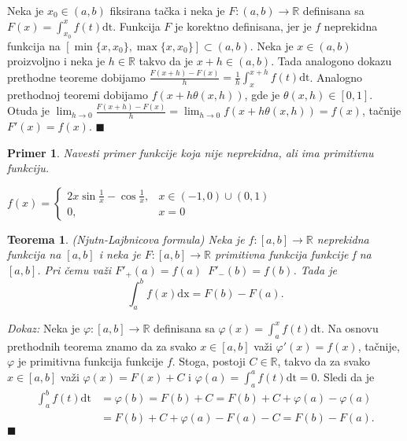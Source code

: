\documentclass{article}
\newtheorem{teorema}{Teorema}[section]
\newtheorem{prim}{Primer}[section]
\begin{document}
Neka je $x_0\in(a, b)$ fiksirana tačka i neka je $F:(a, b) \longrightarrow \mathbb{R}$ definisana sa $F(x) = \displaystyle\int^x_{x_0} f(t)\text{dt}$.
Funkcija $F$ je korektno definisana, jer je $f$ neprekidna funkcija na $[\min\{x, x_0\}, \max\{x, x_0\}]\subset(a, b)$. Neka
je $x\in(a, b)$ proizvoljno i neka je $h\in\mathbb{R}$ takvo da je $x+h\in(a, b)$. Tada analogono dokazu prethodne teoreme dobijamo
$\displaystyle\frac{F(x+h)-F(x)}{h} = \frac{1}{h}\int^{x+h}_x f(t)\text{dt}$.
Analogno prethodnoj teoremi dobijamo $f(x+h\theta(x, h))$, gde je $\theta(x, h)\in[0,1]$.
Otuda je $\displaystyle \lim_{h\longrightarrow 0}\frac{F(x+h)-F(x)}{h} = \lim_{h\longrightarrow 0} f(x+h\theta(x, h)) = f(x)$, tačnije
$F'(x) = f(x)$.
\null\hfill $\blacksquare$\par
\begin{primbox}
    \begin{prim}
        Navesti primer funkcije koja nije neprekidna, ali ima primitivnu funkciju.
    \end{prim}

    $f(x) = \begin{cases}
            2x\sin\frac{1}{x} - \cos\frac{1}{x}, & x\in(-1,0)\cup(0,1) \\
            0,                                   & x = 0
        \end{cases}$
\end{primbox}
\begin{teoremabox}
    \begin{teorema}
        (Njutn-Lajbnicova formula) Neka je $f:[a, b]\longrightarrow \mathbb{R}$ neprekidna funkcija na $[a,b]$ i neka je $F:[a, b]\longrightarrow\mathbb{R}$ primitivna funkcija funkcije f na $[a,b]$. Pri čemu važi $F'_+ (a) = f(a)\,\,\,F'_-(b) = f(b)$. Tada je
        $$ \int^b_a f(x)\text{dx} = F(b) - F(a).$$
    \end{teorema}
\end{teoremabox}
\textit{Dokaz:} Neka je $\varphi: [a, b] \longrightarrow \mathbb{R}$ definisana sa
$\varphi(x) = \displaystyle\int^x_a f(t)\text{dt}$. Na osnovu prethodnih teorema znamo da za svako $x\in [a, b]$ važi $\varphi'(x) = f(x)$,
tačnije, $\varphi$ je primitivna funkcija funkcije $f$. Stoga, postoji
$C \in \mathbb{R}$, takvo da za svako $x \in [a, b]$ važi
$\varphi(x) = F(x) + C$ i $\displaystyle\varphi(a)=\int_{a}^{a} f(t)\text{dt}=0$. Sledi da je
\begin{align*}
    \displaystyle\int^b_a f(t)\text{dt} & = \varphi(b) = F(b) + C = F(b) +C+ \varphi(a) - \varphi(a) \\
                                        & = F(b) +C+ \varphi(a) - F(a)-C = F(b) - F(a).
\end{align*}
\null\hfill $\blacksquare$\par
\end{document}
